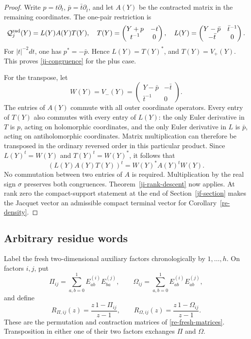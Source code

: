 \begin{proof}
Write \(p=t\partial_t\), \(\bar p=\bar t\partial_{\bar t}\),
and let \(A(Y)\) be the contracted matrix in the remaining
coordinates.  The one-pair restriction is
\[
 \mathcal Q_j^{\rm rad}(Y)=L(Y)A(Y)T(Y),\quad
 T(Y)=\begin{pmatrix}Y+p&-t\\t^{-1}&0\end{pmatrix},\quad
 L(Y)=\begin{pmatrix}Y-\bar p&\bar t^{-1}\\-\bar t&0\end{pmatrix}.
\]
For \(|t|^{-2}dt\), one has \(p^*=-\bar p\).  Hence
\(L(Y)=T(Y)^*\), and \(T(Y)=V_+(Y)\).  This proves
\eqref{ji-congruence} for the plus case.

For the transpose, let
\[
 W(Y)=V_-(Y)=
       \begin{pmatrix}Y-\bar p&-\bar t\\\bar t^{-1}&0\end{pmatrix}.
\]
The entries of \(A(Y)\) commute with all outer coordinate
operators.  Every entry of \(T(Y)\) also commutes with every
entry of \(L(Y)\): the only Euler derivative in \(T\) is
\(p\), acting on holomorphic coordinates, and the only Euler
derivative in \(L\) is \(\bar p\), acting on antiholomorphic
coordinates.  Matrix multiplication can therefore be transposed
in the ordinary reversed order in this particular product.  Since
\(L(Y)^t=W(Y)\) and \(T(Y)^t=W(Y)^*\), it follows that
\[
       (L(Y)A(Y)T(Y))^t=W(Y)^*A(Y)^tW(Y).
\]
No commutation between two entries of \(A\) is required.
Multiplication by the real sign \(\sigma\) preserves both
congruences.  Theorem~\ref{ji-rank-descent} now applies.  At rank
zero the compact-support statement at the end of
Section~\ref{jf-section} makes the Jacquet vector an admissible
compact terminal vector for Corollary~\ref{re-density}.
\end{proof}

\subsection{Arbitrary residue words}
\label{mx-section}

Label the fresh two-dimensional auxiliary factors chronologically
by \(1,\ldots,h\).  On factors \(i,j\), put
\[
 \Pi_{ij}=\sum_{a,b=0}^1 E_{ab}^{(i)}E_{ba}^{(j)},\qquad
 \Omega_{ij}=\sum_{a,b=0}^1 E_{ab}^{(i)}E_{ab}^{(j)},
\]
and define
\[
 R_{\Pi,ij}(z)=\frac{z\,1-\Pi_{ij}}{z-1},\qquad
 R_{\Omega,ij}(z)=\frac{z\,1-\Omega_{ij}}{z-1}.
\]
These are the permutation and contraction matrices of
\eqref{re-fresh-matrices}.  Transposition in either one of their
two factors exchanges \(\Pi\) and \(\Omega\).

